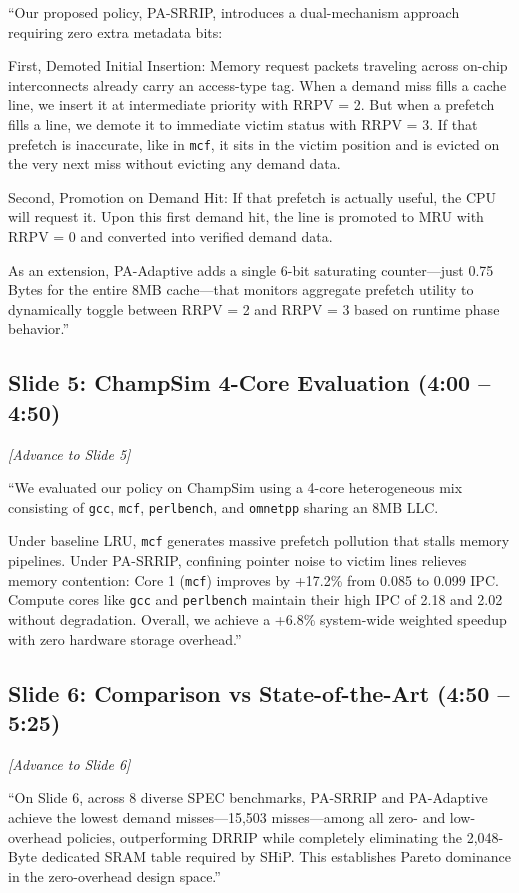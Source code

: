 \documentclass[11pt, a4paper]{article}
\begin{document}
``Our proposed policy, PA-SRRIP, introduces a dual-mechanism approach requiring zero extra metadata bits:

First, Demoted Initial Insertion: Memory request packets traveling across on-chip interconnects already carry an access-type tag. When a demand miss fills a cache line, we insert it at intermediate priority with RRPV = 2. But when a prefetch fills a line, we demote it to immediate victim status with RRPV = 3. If that prefetch is inaccurate, like in \texttt{mcf}, it sits in the victim position and is evicted on the very next miss without evicting any demand data.

Second, Promotion on Demand Hit: If that prefetch is actually useful, the CPU will request it. Upon this first demand hit, the line is promoted to MRU with RRPV = 0 and converted into verified demand data.

As an extension, PA-Adaptive adds a single 6-bit saturating counter---just 0.75 Bytes for the entire 8MB cache---that monitors aggregate prefetch utility to dynamically toggle between RRPV = 2 and RRPV = 3 based on runtime phase behavior.''

\subsection{Slide 5: ChampSim 4-Core Evaluation (4:00 -- 4:50)}
\textit{[Advance to Slide 5]}

``We evaluated our policy on ChampSim using a 4-core heterogeneous mix consisting of \texttt{gcc}, \texttt{mcf}, \texttt{perlbench}, and \texttt{omnetpp} sharing an 8MB LLC.

Under baseline LRU, \texttt{mcf} generates massive prefetch pollution that stalls memory pipelines. Under PA-SRRIP, confining pointer noise to victim lines relieves memory contention: Core 1 (\texttt{mcf}) improves by +17.2\% from 0.085 to 0.099 IPC. Compute cores like \texttt{gcc} and \texttt{perlbench} maintain their high IPC of 2.18 and 2.02 without degradation. Overall, we achieve a +6.8\% system-wide weighted speedup with zero hardware storage overhead.''

\subsection{Slide 6: Comparison vs State-of-the-Art (4:50 -- 5:25)}
\textit{[Advance to Slide 6]}

``On Slide 6, across 8 diverse SPEC benchmarks, PA-SRRIP and PA-Adaptive achieve the lowest demand misses---15,503 misses---among all zero- and low-overhead policies, outperforming DRRIP while completely eliminating the 2,048-Byte dedicated SRAM table required by SHiP. This establishes Pareto dominance in the zero-overhead design space.''
\end{document}
